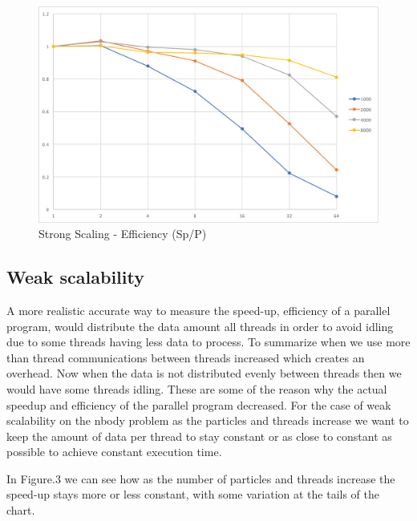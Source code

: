 \documentclass[12pt]{article} %
\begin{document}
\begin{figure}[htb]
\caption{Strong Scaling - Efficiency (Sp/P)}\label{fig:benchmark01}
\centering
\includegraphics[width=\textwidth,keepaspectratio]{imgs/img02.png}
\end{figure} 

\newpage

\subsection{Weak scalability}

A more realistic accurate way to measure the speed-up, efficiency of a parallel program, would distribute the data amount all threads in order to avoid idling due to some threads having less data to process. To summarize when we use more than thread communications between threads increased which creates an overhead. Now when the data is not distributed evenly between threads then we would have some threads idling. These are some of the reason why the actual speedup and efficiency of the parallel program decreased. For the case of weak scalability on the nbody problem as the particles and threads increase we want to keep the amount of data per thread to stay constant or as close to constant as possible to achieve constant execution time. 

In Figure.3 we can see how as the number of particles and threads increase the speed-up stays more or less constant, with some variation at the tails of the chart. 
\end{document}

